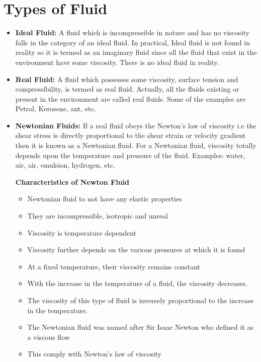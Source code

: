 \documentclass[11pt]{report}
\newcommand{\bt}[1]{\textbf{#1}}
\begin{document}
	\section{Types of Fluid}
	\begin{itemize}[label=--]
		\item \bt{Ideal Fluid:} A fluid which is incompressible in nature and has no viscosity falls in the category of an ideal fluid. In practical, Ideal fluid is not found in reality so it is termed as an imaginary fluid since all the fluid that exist in the environment have some viscosity. There is no ideal fluid in reality.
		
		\item \bt{Real Fluid:} A fluid which possesses some viscosity, surface tension and compressibility, is termed as real fluid. Actually, all the fluids existing or present in the environment are called real fluids. Some of the examples are Petrol, Kerosene, ant, etc.
		
		\item \bt{Newtonian Fluids:} If a real fluid obeys the Newton's law of viscosity i.e the shear stress is directly proportional to the shear strain or velocity gradient then it is known as a Newtonian fluid. For a Newtonian fluid, viscosity totally depends upon the temperature and pressure of the fluid. Examples: water, air, air, emulsion, hydrogen, etc.
		
		\bt{Characteristics of Newton Fluid}
		\begin{itemize}[label=*]
			\item Newtonian fluid to not have any elastic properties
			\item They are incompressible, isotropic and unreal
			\item Viscosity is temperature dependent
			\item Viscosity further depends on the various pressures at which it is found
			\item At a fixed temperature, their viscosity remains constant
			\item With the increase in the temperature of a fluid, the viscosity decreases.
			\item The viscosity of this type of fluid is inversely proportional to the increase in the temperature.
			\item The Newtonian fluid was named after Sir Isaac Newton who defined it as a viscous flow
			\item This comply with Newton's law of viscosity
		\end{itemize}
	

\end{itemize}
\end{document}
